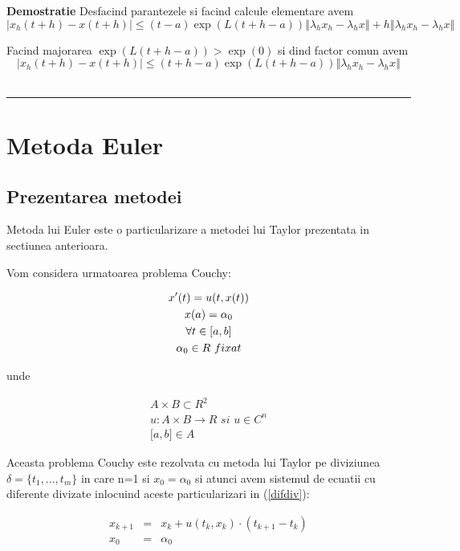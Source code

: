 \documentclass[a4paper,twoside]{book}
\newenvironment{proof}[1][Proof]{\noindent\textbf{Demostratie} }{\ \rule{0.5em}{0.5em}}
\begin{document}
\begin{proof}
Desfacind parantezele si facind calcule elementare avem%
\begin{equation*}
\left\vert x_{h}(t+h)-x(t+h)\right\vert \leq (t-a)\exp (L(t+h-a))\left\Vert
\lambda _{h}x_{h}-\lambda _{h}x\right\Vert +h\left\Vert \lambda
_{h}x_{h}-\lambda _{h}x\right\Vert
\end{equation*}

Facind majorarea $\exp (L(t+h-a))>\exp (0)$ si dind factor comun avem%
\begin{equation*}
\left\vert x_{h}(t+h)-x(t+h)\right\vert \leq (t+h-a)\exp
(L(t+h-a))\left\Vert \lambda _{h}x_{h}-\lambda _{h}x\right\Vert
\end{equation*}
\end{proof}

\chapter{Metoda Euler}

\section{Prezentarea metodei}

Metoda lui Euler este o particularizare a metodei lui Taylor prezentata in
sectiunea anterioara.

Vom considera urmatoarea problema Couchy:

\begin{gather}
x^{\prime }(t)=u(t,x(t))  \label{PCouchyE} \\
x(a)=\alpha _{0}  \notag \\
\forall t\in \lbrack a,b]  \notag \\
\alpha _{0}\in R\,\,fixat  \notag
\end{gather}

unde

\begin{gather*}
A\times B\subset R^{2} \\
u:A\times B\rightarrow R\,\,si\,\,u\in C^{n} \\
\lbrack a,b]\in A
\end{gather*}

Aceasta problema Couchy este rezolvata cu metoda lui Taylor pe diviziunea $%
\delta =\{t_{1},...,t_{m}\}$ in care n=1 si $x_{0}=\alpha _{0}$ si atunci
avem sistemul de ecuatii cu diferente divizate inlocuind aceste
particularizari in (\ref{difdiv}):

\begin{eqnarray*}
x_{k+1} &=&x_{k}+u(t_{k},x_{k})\cdot (t_{k+1}-t_{k}) \\
x_{0} &=&\alpha _{0}
\end{eqnarray*}
\end{document}
